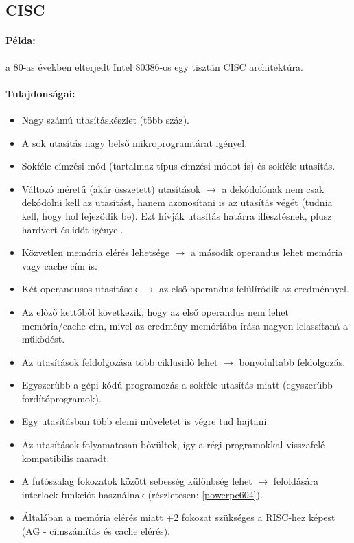 \subsection{CISC}
\paragraph{Példa:} a 80-as években elterjedt Intel 80386-os egy tisztán CISC architektúra.
\paragraph{Tulajdonságai:}
\begin{itemize}
    \item Nagy számú utasításkészlet (több száz).
    \item A sok utasítás nagy belső mikroprogramtárat igényel.
    \item Sokféle címzési mód (tartalmaz típus címzési módot is) és sokféle utasítás.
    \item Változó méretű (akár összetett) utasítások $\rightarrow$ a dekódolónak nem csak dekódolni kell az utasítást, hanem azonosítani is az utasítás végét (tudnia kell, hogy hol fejeződik be). Ezt hívják utasítás határra illesztésnek, plusz hardvert és időt igényel.
    \item Közvetlen memória elérés lehetsége $\rightarrow$ a második operandus lehet memória vagy cache cím is.
    \item Két operandusos utasítások $\rightarrow$ az első operandus felülíródik az eredménnyel.
    \item Az előző kettőből következik, hogy az első operandus nem lehet memória/cache cím, mivel az eredmény memóriába írása nagyon lelassítaná a működést.
    \item Az utasítások feldolgozása több ciklusidő lehet $\rightarrow$ bonyolultabb feldolgozás.
    \item Egyszerűbb a gépi kódú programozás a sokféle utasítás miatt (egyszerűbb fordítóprogramok).
    \item Egy utasításban több elemi műveletet is végre tud hajtani.
    \item Az utasítások folyamatosan bővültek, így a régi programokkal visszafelé kompatibilis maradt.
    \item A futószalag fokozatok között sebesség különbség lehet $\rightarrow$ feloldására interlock funkciót használnak (részletesen: \ref{powerpc604}).
    \item Általában a memória elérés miatt +2 fokozat szükséges a RISC-hez képest (AG - címszámítás és cache elérés).
\end{itemize}
